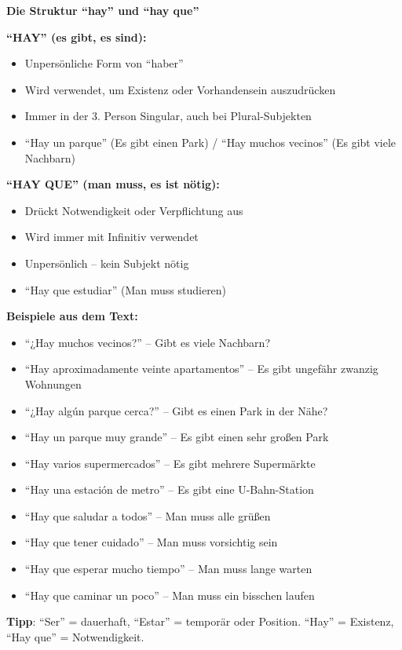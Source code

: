 \documentclass[12pt,a4paper]{article}
\begin{document}
\textbf{Die Struktur \enquote{hay} und \enquote{hay que}}

\textbf{\enquote{HAY} (es gibt, es sind):}
\begin{itemize}[leftmargin=*]
    \item Unpersönliche Form von \enquote{haber}
    \item Wird verwendet, um Existenz oder Vorhandensein auszudrücken
    \item Immer in der 3. Person Singular, auch bei Plural-Subjekten
    \item \enquote{Hay un parque} (Es gibt einen Park) / \enquote{Hay muchos vecinos} (Es gibt viele Nachbarn)
\end{itemize}

\textbf{\enquote{HAY QUE} (man muss, es ist nötig):}
\begin{itemize}[leftmargin=*]
    \item Drückt Notwendigkeit oder Verpflichtung aus
    \item Wird immer mit Infinitiv verwendet
    \item Unpersönlich -- kein Subjekt nötig
    \item \enquote{Hay que estudiar} (Man muss studieren)
\end{itemize}

\textbf{Beispiele aus dem Text:}
\begin{itemize}[leftmargin=*]
    \item \enquote{¿Hay muchos vecinos?} -- Gibt es viele Nachbarn?
    \item \enquote{Hay aproximadamente veinte apartamentos} -- Es gibt ungefähr zwanzig Wohnungen
    \item \enquote{¿Hay algún parque cerca?} -- Gibt es einen Park in der Nähe?
    \item \enquote{Hay un parque muy grande} -- Es gibt einen sehr großen Park
    \item \enquote{Hay varios supermercados} -- Es gibt mehrere Supermärkte
    \item \enquote{Hay una estación de metro} -- Es gibt eine U-Bahn-Station
    \item \enquote{Hay que saludar a todos} -- Man muss alle grüßen
    \item \enquote{Hay que tener cuidado} -- Man muss vorsichtig sein
    \item \enquote{Hay que esperar mucho tiempo} -- Man muss lange warten
    \item \enquote{Hay que caminar un poco} -- Man muss ein bisschen laufen
\end{itemize}

\textbf{Tipp}: \enquote{Ser} = dauerhaft, \enquote{Estar} = temporär oder Position. \enquote{Hay} = Existenz, \enquote{Hay que} = Notwendigkeit.
\end{document}
